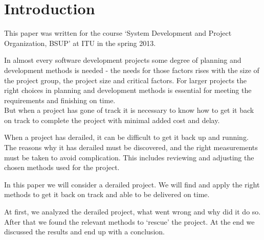 \section{Introduction}
This paper was written for the course `System Development and Project Organization, BSUP' at ITU in the spring 2013.

In almost every software development projects some degree of planning and development methods is needed - the needs for those factors rises with the size of the project group, the project size and critical factors. For larger projects the right choices in planning and development methods is essential for meeting the requirements and finishing on time.\\
But when a project has gone of track it is necessary to know how to get it back on track to complete the project with minimal added cost and delay.

When a project has derailed, it can be difficult to get it back up and running. The reasons why it has derailed must be discovered, and the right measurements must be taken to avoid complication. This includes reviewing and adjusting the chosen methods used for the project.

In this paper we will consider a derailed project. We will find and apply the right methods to get it back on track and able to be delivered on time.

At first, we analyzed the derailed project, what went wrong and why did it do so. After that we found the relevant methods to `rescue' the project. At the end we discussed the results and end up with a conclusion.
\newpage